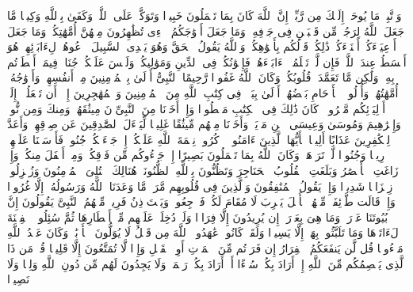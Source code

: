 \stopbuffer
\startbuffer[\q:33:2]
وَٱتَّبِعۡ مَا یُوحَىٰۤ إِلَیۡكَ مِن رَّبِّكَۚ إِنَّ ٱللَّهَ كَانَ بِمَا تَعۡمَلُونَ خَبِیرࣰا%
\stopbuffer
\startbuffer[\q:33:3]
وَتَوَكَّلۡ عَلَى ٱللَّهِۚ وَكَفَىٰ بِٱللَّهِ وَكِیلࣰا%
\stopbuffer
\startbuffer[\q:33:4]
مَّا جَعَلَ ٱللَّهُ لِرَجُلࣲ مِّن قَلۡبَیۡنِ فِی جَوۡفِهِۦۚ وَمَا جَعَلَ أَزۡوَٰجَكُمُ ٱلَّٰۤءِی تُظَٰهِرُونَ مِنۡهُنَّ أُمَّهَٰتِكُمۡۚ وَمَا جَعَلَ أَدۡعِیَاۤءَكُمۡ أَبۡنَاۤءَكُمۡۚ ذَٰلِكُمۡ قَوۡلُكُم بِأَفۡوَٰهِكُمۡۖ وَٱللَّهُ یَقُولُ ٱلۡحَقَّ وَهُوَ یَهۡدِی ٱلسَّبِیلَ%
\stopbuffer
\startbuffer[\q:33:5]
ٱدۡعُوهُمۡ لِءَابَاۤئِهِمۡ هُوَ أَقۡسَطُ عِندَ ٱللَّهِۚ فَإِن لَّمۡ تَعۡلَمُوۤا۟ ءَابَاۤءَهُمۡ فَإِخۡوَٰنُكُمۡ فِی ٱلدِّینِ وَمَوَٰلِیكُمۡۚ وَلَیۡسَ عَلَیۡكُمۡ جُنَاحࣱ فِیمَاۤ أَخۡطَأۡتُم بِهِۦ وَلَٰكِن مَّا تَعَمَّدَتۡ قُلُوبُكُمۡۚ وَكَانَ ٱللَّهُ غَفُورࣰا رَّحِیمًا%
\stopbuffer
\startbuffer[\q:33:6]
ٱلنَّبِیُّ أَوۡلَىٰ بِٱلۡمُؤۡمِنِینَ مِنۡ أَنفُسِهِمۡۖ وَأَزۡوَٰجُهُۥۤ أُمَّهَٰتُهُمۡۗ وَأُو۟لُوا۟ ٱلۡأَرۡحَامِ بَعۡضُهُمۡ أَوۡلَىٰ بِبَعۡضࣲ فِی كِتَٰبِ ٱللَّهِ مِنَ ٱلۡمُؤۡمِنِینَ وَٱلۡمُهَٰجِرِینَ إِلَّاۤ أَن تَفۡعَلُوۤا۟ إِلَىٰۤ أَوۡلِیَاۤئِكُم مَّعۡرُوفࣰاۚ كَانَ ذَٰلِكَ فِی ٱلۡكِتَٰبِ مَسۡطُورࣰا%
\stopbuffer
\startbuffer[\q:33:7]
وَإِذۡ أَخَذۡنَا مِنَ ٱلنَّبِیِّۦنَ مِیثَٰقَهُمۡ وَمِنكَ وَمِن نُّوحࣲ وَإِبۡرَٰهِیمَ وَمُوسَىٰ وَعِیسَى ٱبۡنِ مَرۡیَمَۖ وَأَخَذۡنَا مِنۡهُم مِّیثَٰقًا غَلِیظࣰا%
\stopbuffer
\startbuffer[\q:33:8]
لِّیَسۡءَلَ ٱلصَّٰدِقِینَ عَن صِدۡقِهِمۡۚ وَأَعَدَّ لِلۡكَٰفِرِینَ عَذَابًا أَلِیمࣰا%
\stopbuffer
\startbuffer[\q:33:9]
یَٰۤأَیُّهَا ٱلَّذِینَ ءَامَنُوا۟ ٱذۡكُرُوا۟ نِعۡمَةَ ٱللَّهِ عَلَیۡكُمۡ إِذۡ جَاۤءَتۡكُمۡ جُنُودࣱ فَأَرۡسَلۡنَا عَلَیۡهِمۡ رِیحࣰا وَجُنُودࣰا لَّمۡ تَرَوۡهَاۚ وَكَانَ ٱللَّهُ بِمَا تَعۡمَلُونَ بَصِیرًا%
\stopbuffer
\startbuffer[\q:33:10]
إِذۡ جَاۤءُوكُم مِّن فَوۡقِكُمۡ وَمِنۡ أَسۡفَلَ مِنكُمۡ وَإِذۡ زَاغَتِ ٱلۡأَبۡصَٰرُ وَبَلَغَتِ ٱلۡقُلُوبُ ٱلۡحَنَاجِرَ وَتَظُنُّونَ بِٱللَّهِ ٱلظُّنُونَا۠%
\stopbuffer
\startbuffer[\q:33:11]
هُنَالِكَ ٱبۡتُلِیَ ٱلۡمُؤۡمِنُونَ وَزُلۡزِلُوا۟ زِلۡزَالࣰا شَدِیدࣰا%
\stopbuffer
\startbuffer[\q:33:12]
وَإِذۡ یَقُولُ ٱلۡمُنَٰفِقُونَ وَٱلَّذِینَ فِی قُلُوبِهِم مَّرَضࣱ مَّا وَعَدَنَا ٱللَّهُ وَرَسُولُهُۥۤ إِلَّا غُرُورࣰا%
\stopbuffer
\startbuffer[\q:33:13]
وَإِذۡ قَالَت طَّاۤئِفَةࣱ مِّنۡهُمۡ یَٰۤأَهۡلَ یَثۡرِبَ لَا مُقَامَ لَكُمۡ فَٱرۡجِعُوا۟ۚ وَیَسۡتَءۡذِنُ فَرِیقࣱ مِّنۡهُمُ ٱلنَّبِیَّ یَقُولُونَ إِنَّ بُیُوتَنَا عَوۡرَةࣱ وَمَا هِیَ بِعَوۡرَةٍۖ إِن یُرِیدُونَ إِلَّا فِرَارࣰا%
\stopbuffer
\startbuffer[\q:33:14]
وَلَوۡ دُخِلَتۡ عَلَیۡهِم مِّنۡ أَقۡطَارِهَا ثُمَّ سُئِلُوا۟ ٱلۡفِتۡنَةَ لَءَاتَوۡهَا وَمَا تَلَبَّثُوا۟ بِهَاۤ إِلَّا یَسِیرࣰا%
\stopbuffer
\startbuffer[\q:33:15]
وَلَقَدۡ كَانُوا۟ عَٰهَدُوا۟ ٱللَّهَ مِن قَبۡلُ لَا یُوَلُّونَ ٱلۡأَدۡبَٰرَۚ وَكَانَ عَهۡدُ ٱللَّهِ مَسۡءُولࣰا%
\stopbuffer
\startbuffer[\q:33:16]
قُل لَّن یَنفَعَكُمُ ٱلۡفِرَارُ إِن فَرَرۡتُم مِّنَ ٱلۡمَوۡتِ أَوِ ٱلۡقَتۡلِ وَإِذࣰا لَّا تُمَتَّعُونَ إِلَّا قَلِیلࣰا%
\stopbuffer
\startbuffer[\q:33:17]
قُلۡ مَن ذَا ٱلَّذِی یَعۡصِمُكُم مِّنَ ٱللَّهِ إِنۡ أَرَادَ بِكُمۡ سُوۤءًا أَوۡ أَرَادَ بِكُمۡ رَحۡمَةࣰۚ وَلَا یَجِدُونَ لَهُم مِّن دُونِ ٱللَّهِ وَلِیࣰّا وَلَا نَصِیرࣰا%
\stopbuffer
